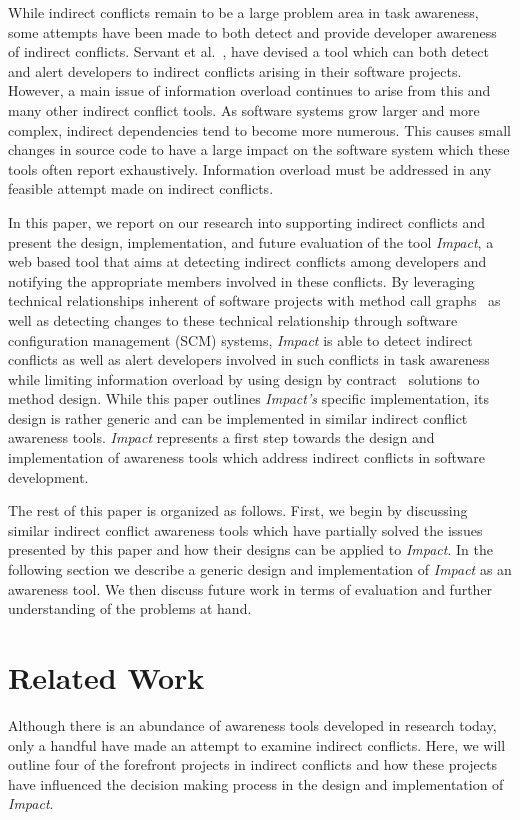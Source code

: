 \documentclass[conference]{IEEEtran}
\begin{document}
While indirect conflicts remain to be a large problem area in task awareness,
some attempts have been made to both detect and provide developer awareness
of indirect conflicts. Servant et al.~\cite{Servant:2010:CPI}, have devised a tool
which can both detect and alert developers to indirect conflicts arising in 
their software projects. However, a main issue of information overload continues
to arise from this and many other indirect conflict tools. As software systems
grow larger and more complex, indirect dependencies tend to become more numerous.
This causes small changes in source code to have a large impact on the software system
which these tools often report exhaustively. Information overload must be addressed
in any feasible attempt made on indirect conflicts.

In this paper, we report on our research into supporting indirect conflicts
and present the design, implementation, and future evaluation of the tool \textit{Impact},
a web based tool that aims at detecting indirect conflicts among developers
and notifying the appropriate members involved in these conflicts.
By leveraging technical relationships inherent of 
software projects with method call graphs~\cite{Lakhotia:1993:CCM}
as well as detecting changes
to these technical relationship through software configuration management
(SCM) systems, \textit{Impact} is able to detect indirect conflicts as well as
alert developers involved in such conflicts in task awareness while limiting information
overload by using design by contract~\cite{Meyer:1988} solutions to method design. While this paper
outlines \textit{Impact's} specific implementation, its design is rather
generic and can be implemented in similar indirect conflict awareness tools.
\textit{Impact} represents a first step towards the design and implementation
of awareness tools which address indirect conflicts in software development.

The rest of this paper is organized as follows. First, we begin by discussing
similar indirect conflict awareness tools which have partially solved the
issues presented by this paper and how their designs can be applied to 
\textit{Impact}. In the following section we describe a generic design and implementation
of \textit{Impact} as an awareness tool. We then discuss future work in terms
of evaluation and further understanding of the problems at hand.


\section{Related Work}
Although there is an abundance of awareness tools developed in research
today, only a handful have made an attempt to examine indirect conflicts.
Here, we will outline four of the forefront projects in indirect conflicts
and how these projects have influenced the decision making process in
the design and implementation of \textit{Impact}.
\end{document}
